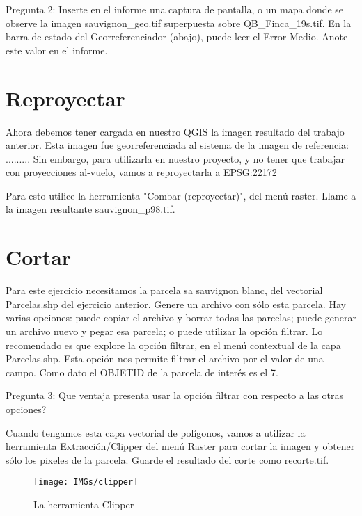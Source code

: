\documentclass[onecolumn]{article}
\begin{document}
\begin{mdframed}[]
	Pregunta 2: Inserte en el informe una captura de pantalla, o un mapa donde se observe la imagen sauvignon\_geo.tif superpuesta sobre QB\_Finca\_19s.tif. En la barra de estado del Georreferenciador (abajo), puede leer el Error Medio. Anote este valor en el informe.
\end{mdframed}

\section{Reproyectar}

Ahora debemos tener cargada en nuestro QGIS la imagen resultado del trabajo anterior. Esta imagen fue georreferenciada al sistema de la imagen de referencia: ......... Sin embargo, para utilizarla en nuestro proyecto, y no tener que trabajar con proyecciones al-vuelo, vamos a reproyectarla a EPSG:22172

Para esto utilice la herramienta "Combar (reproyectar)", del menú raster. Llame a la imagen resultante sauvignon\_p98.tif.

\section{Cortar}

Para este ejercicio necesitamos la parcela sa sauvignon blanc, del vectorial Parcelas.shp del ejercicio anterior. Genere un archivo con sólo esta parcela. Hay varias opciones: puede copiar el archivo y borrar todas las parcelas; puede generar un archivo nuevo y pegar esa parcela; o puede utilizar la opción filtrar. Lo recomendado es que explore la opción filtrar, en el menú contextual de la capa Parcelas.shp. Esta opción nos permite filtrar el archivo por el valor de una campo. Como dato el OBJETID de la parcela de interés es el 7.

\begin{mdframed}[]
	Pregunta 3: Que ventaja presenta usar la opción filtrar con respecto a las otras opciones?
\end{mdframed}

Cuando tengamos esta capa vectorial de polígonos, vamos a utilizar la herramienta Extracción/Clipper del menú Raster para cortar la imagen y obtener sólo los pixeles de la parcela. Guarde el resultado del corte como recorte.tif.

\begin{figure}[h]
	\centering
	\texttt{[image: IMGs/clipper]}
	\caption{La herramienta Clipper}
\end{figure}
\end{document}

